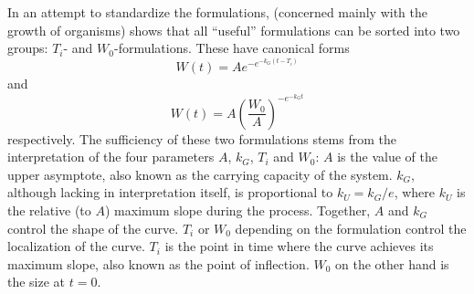 In an attempt to standardize the formulations, \cite{tjorve2017gompertz} (concerned mainly with the growth of organisms) shows that all \enquote{useful} formulations can be sorted into two groups: \(T_i\)- and \(W_0\)-formulations.
These have canonical forms
\begin{equation} \label{eq:gompertz-ti-function}
  W(t) = A e^{-e^{-k_G(t-T_i)}}
\end{equation}
and
\begin{equation} \label{eq:gompertz-w0-function}
  W(t) = A \left(\frac{W_0}{A}\right)^{-e^{-k_G t}}
\end{equation}
respectively.
The sufficiency of these two formulations stems from the interpretation of the four parameters \(A\), \(k_G\), \(T_i\) and \(W_0\):
\(A\) is the value of the upper asymptote, also known as the carrying capacity of the system.
\(k_G\), although lacking in interpretation itself, is proportional to \(k_U = k_G / e\), where \(k_U\) is the relative (to \(A\)) maximum slope during the process.
Together, \(A\) and \(k_G\) control the shape of the curve.
\(T_i\) or \(W_0\) depending on the formulation control the localization of the curve.
\(T_i\) is the point in time where the curve achieves its maximum slope, also known as the point of inflection.
\(W_0\) on the other hand is the size at \(t=0\).

